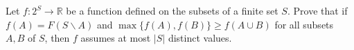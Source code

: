 Let $f\colon 2^S\rightarrow \mathbb R$ be a function defined on the subsets of a finite set $S$. Prove that if $f(A)=F(S\backslash A)$ and $\max \{ f(A), f(B)\}\geq f(A\cup B)$ for all subsets $A, B$ of $S$, then $f$ assumes at most $|S|$ distinct values.
